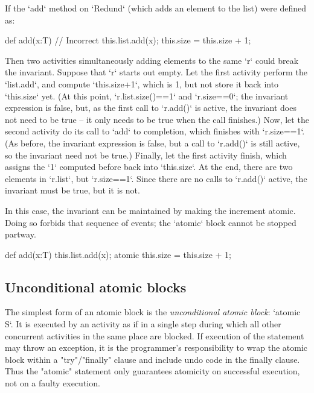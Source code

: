 If the \xcd`add` method on \xcd`Redund` (which adds an element to the list) 
were defined as: 
\begin{xten}
def add(x:T) { // Incorrect
  this.list.add(x);
  this.size = this.size + 1;
}
\end{xten}
Then two activities simultaneously adding elements to the same \xcd`r` could break the
invariant.  Suppose that \xcd`r` starts out empty.  Let the first activity
perform the \xcd`list.add`, and compute \xcd`this.size+1`, which is 1, but not store it
back into \xcd`this.size` yet.  
(At this point, \xcd`r.list.size()==1` and \xcd`r.size==0`; the invariant
expression is false, but, as the first call to \xcd`r.add()` is active, the
invariant does not need to be true -- it only needs to be true when the
call finishes.)
Now, let the second activity do its call to
\xcd`add` to completion, which finishes with \xcd`r.size==1`.  
(As before, the invariant expression is false, but a call to \xcd`r.add()` is
still active, so the invariant need not be true.)
Finally, let
the first activity finish, which assigns the \xcd`1` computed before back into
\xcd`this.size`.  At the end, there are two elements in \xcd`r.list`, but
\xcd`r.size==1`. Since there are no calls to \xcd`r.add()` active, the
invariant must be true, but it is not.

In this case, the invariant can be maintained by making the increment atomic.
Doing so forbids that sequence of events; the \xcd`atomic` block cannot be
stopped partway.  
\begin{xten}
def add(x:T) { 
  this.list.add(x);
  atomic { this.size = this.size + 1; }
}
\end{xten}



\subsection{Unconditional atomic blocks}
The simplest form of an atomic block is the {\em unconditional
atomic block}: \xcd`atomic S`.
It is executed by an activity as if in a single step
during which all other concurrent activities in the same place are
blocked. If execution of the statement may throw an exception, it is
the programmer's responsibility to wrap the atomic block within a
\xcd"try"/\xcd"finally" clause and include undo code in the finally
clause. Thus the \xcd"atomic" statement only guarantees atomicity on
successful execution, not on a faulty execution.


